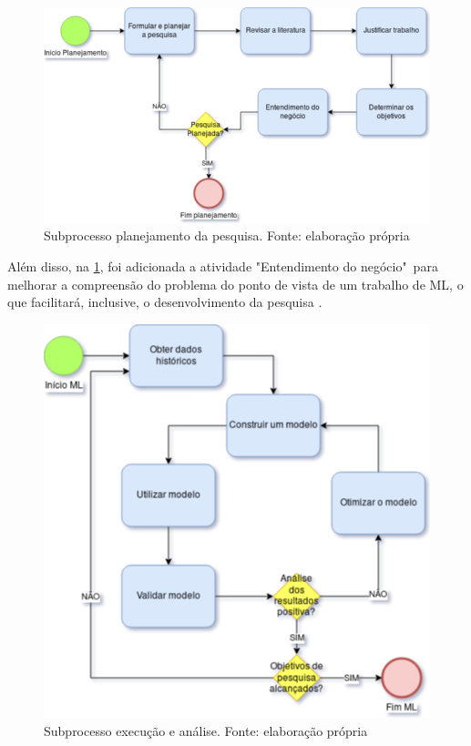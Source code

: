 \begin{figure}[h]
	\centering
    \includegraphics[keepaspectratio=true,scale=0.5]{figuras/subprocessoPlanejamento}
	\caption[Subprocesso planejamento da pesquisa]{Subprocesso planejamento da pesquisa. Fonte: elaboração própria}
	\label{fig:subprocessoPlanejamento}
\end{figure}

Além disso, na \ref{fig:subprocessoPlanejamento}, foi adicionada a atividade "Entendimento do negócio"\ para melhorar a compreensão do problema do ponto de vista de um trabalho de ML, o que facilitará, inclusive, o desenvolvimento da pesquisa \cite{CROWSTON2017}.

\begin{figure}[h]
	\centering
    \includegraphics[keepaspectratio=true,scale=0.5]{figuras/subprocessoAnalise}
	\caption[Subprocesso execução e análise]{Subprocesso execução e análise. Fonte: elaboração própria}
	\label{fig:subprocessoAnalise}
\end{figure}

